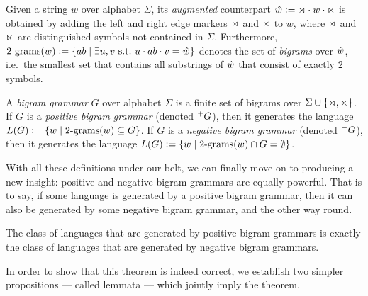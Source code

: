 \begin{definition}[Bigrams]
    Given a string $w$ over alphabet $\Sigma$, its \emph{augmented} counterpart $\hat{w} \mathrel{\mathop:}= \rtimes \cdot w \cdot \ltimes$ is obtained by adding the left and right edge markers $\rtimes$ and $\ltimes$ to $w$, where $\rtimes$ and $\ltimes$ are distinguished symbols not contained in $\Sigma$.
    Furthermore, 
    \(
    \mathrm{2\text{-}grams}(w) \mathrel{\mathop:}=
        \left \{ 
            ab \mid \exists u,v  \text{ s.t.\ } u \cdot ab \cdot v = \hat{w}
         \right \}
    \)
    denotes the set of \emph{bigrams} over $\hat{w}$, i.e.\ the smallest set that contains all substrings of $\hat{w}$ that consist of exactly $2$ symbols.
\end{definition}

\begin{definition}
    A \emph{bigram grammar} $G$ over alphabet $\Sigma$ is a finite set of bigrams over $\Sigma \cup \left \{ \rtimes, \ltimes \right \}$.
    If $G$ is a \emph{positive bigram grammar} (denoted $^+ G$), then it generates the language
    \(
        L(G) \mathrel{\mathop:}= \left \{ 
            w \mid \mathrm{2\text{-}grams}(w) \subseteq G
         \right \}
    \).
    If $G$ is a \emph{negative bigram grammar} (denoted $^- G$), then it generates the language
    \(
        L(G) \mathrel{\mathop:}= \left \{ 
            w \mid \mathrm{2\text{-}grams}(w) \cap G = \emptyset
         \right \}
    \).
\end{definition}

With all these definitions under our belt, we can finally move on to producing a new insight: positive and negative bigram grammars are equally powerful.
That is to say, if some language is generated by a positive bigram grammar, then it can also be generated by some negative bigram grammar, and the other way round.

\begin{theorem}
    The class of languages that are generated by positive bigram grammars is exactly the class of languages that are generated by negative bigram grammars.
    \label{thm:SL_PosNegEquivalence}
\end{theorem}
%
In order to show that this theorem is indeed correct, we establish two simpler propositions --- called lemmata --- which jointly imply the theorem.

